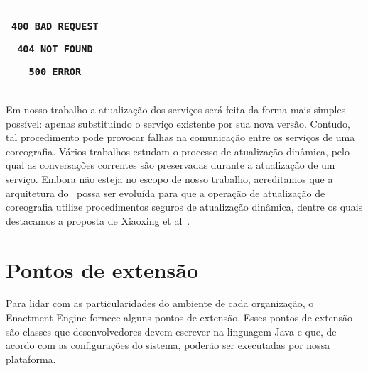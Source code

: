 \begin{description}
{\begin{tabular}{|c|c|c|c|}
\begin{minipage}{2in}
\begin{verbatim}
400 BAD REQUEST

404 NOT FOUND

500 ERROR

\end{verbatim}
\end{minipage} 
\\ 
\hline 
\end{tabular} 
}

Em nosso trabalho a atualização dos serviços será feita da forma mais simples possível: apenas substituindo o serviço existente por sua nova versão. Contudo, tal procedimento pode provocar falhas na comunicação entre os serviços de uma coreografia. Vários trabalhos \cite{Kramer1990Philosophers, Vandewoude2007Tranquility, Xiaoxing2011VersionConsistent} estudam o processo de atualização dinâmica, pelo qual as conversações correntes são preservadas durante a atualização de um serviço. Embora não esteja no escopo de nosso trabalho, acreditamos que a arquitetura do \ee\ possa ser evoluída para que a operação de atualização de coreografia utilize procedimentos seguros de atualização dinâmica, dentre os quais destacamos a proposta de Xiaoxing et al~\cite{Xiaoxing2011VersionConsistent}.

\end{description}

\section{Pontos de extensão}
\label{sec:extensao}

Para lidar com as particularidades do ambiente de cada organização, o Enactment Engine fornece alguns pontos de extensão. Esses pontos de extensão são classes que desenvolvedores devem escrever na linguagem Java e que, de acordo com as configurações do sistema, poderão ser executadas por nossa plataforma.


